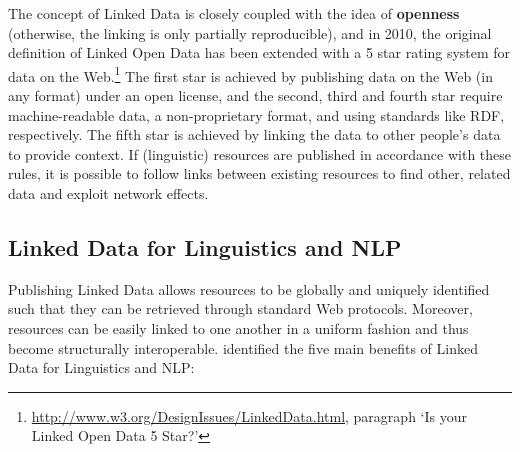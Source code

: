 The concept of Linked Data is closely coupled with the idea of \textbf{openness} (otherwise, the linking is only partially reproducible), and in 2010, the original definition of Linked Open Data has been extended with a 5 star rating system for data on the Web.\footnote{\url{http://www.w3.org/DesignIssues/LinkedData.html}, paragraph `Is your Linked Open Data 5 Star?'} The first star is achieved by publishing data on the Web (in any format) under an open license, and the second, third and fourth star require machine-readable data, a non-proprietary format, and using standards like RDF, respectively. The fifth star is achieved by linking the data to other people's data to provide context.
If (linguistic) resources are published in accordance with these rules, it is possible to follow links between existing resources to find other, related data and exploit network effects.

\subsection{Linked Data for Linguistics and NLP}
\label{sec-linked-data}

Publishing Linked Data allows resources to be globally and uniquely identified such that they can be retrieved through standard Web protocols. Moreover, resources can be easily linked to one another in a uniform fashion and thus become structurally interoperable. \citep{chiarcos-etal2012-ntrolr} identified the five main benefits of Linked Data for Linguistics and NLP: 

